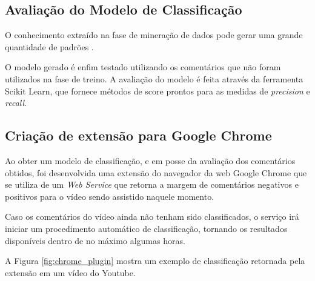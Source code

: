 \subsection{Avaliação do Modelo de Classificação}
O conhecimento extraído na fase de mineração de dados pode gerar uma grande quantidade de padrões \cite{morais2007mineraccao}.

O modelo gerado é enfim testado utilizando os comentários que não foram utilizados na fase de treino. 
A avaliação do modelo é feita através da ferramenta Scikit Learn, que fornece métodos de score prontos para as medidas de \textit{precision} e \textit{recall}. %

\subsection{Criação de extensão para Google Chrome}

Ao obter um modelo de classificação, e em posse da avaliação dos comentários obtidos, foi desenvolvida uma extensão do navegador da web Google Chrome que se utiliza de um \textit{Web Service} que retorna a margem de comentários negativos e positivos para o vídeo sendo assistido naquele momento. 

Caso os comentários do vídeo ainda não tenham sido classificados, o serviço irá iniciar um procedimento automático de classificação, tornando os resultados disponíveis dentro de no máximo algumas horas.

A Figura \ref{fig:chrome_plugin} mostra um exemplo de classificação retornada pela extensão em um vídeo do Youtube.

